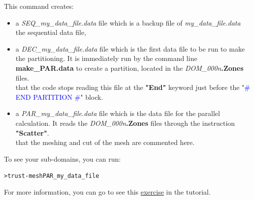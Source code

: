 This command creates:
\begin{itemize} 
\item a \textit{SEQ\_my\_data\_file.data} file which is a backup file of \textit{my\_data\_file.data} the sequential data file,
\item a \textit{DEC\_my\_data\_file.data} file which is the first data file to be run to make the partitioning. It is immediately run by the command line \textbf{make\_PAR.data} to create a partition, located in the \textit{DOM\_000n}\textbf{.Zones} files. \\
\Note that the code stops reading this file at the \textbf{"End"} keyword just before the "\textcolor{blue}{\# END PARTITION \#}" block.
\item a \textit{PAR\_my\_data\_file.data} file which is the data file for the parallel calculation. It reads the \textit{DOM\_000n}\textbf{.Zones} files through the instruction \textbf{"Scatter"}.\\
\Note that the meshing and cut of the mesh are commented here.
\end{itemize}

To see your sub-domains, you can run:
\begin{alltt} 
> trust -mesh PAR_my_data_file
\end{alltt}

For more information, you can go to see this \href{TRUST_tutorial.pdf\#exo_para_2}{exercise} in the \trust tutorial.



